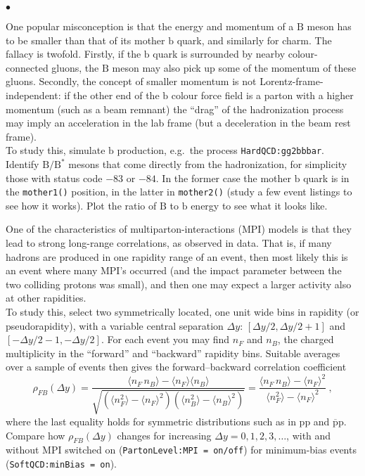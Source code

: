 \documentclass[12pt,a4paper]{article}
\renewcommand{\b}{{\mathrm b}}
\newcommand{\p}{{\mathrm p}}
\renewcommand{\B}{{\mathrm B}}
\newcommand{\pbar}{\overline{\mathrm p}}
\newenvironment{Itemize}{\begin{list}{$\bullet$}%
{\setlength{\topsep}{0.4mm}\setlength{\partopsep}{0.4mm}%
\setlength{\itemsep}{0.4mm}\setlength{\parsep}{0.4mm}}}%
{\end{list}}
\begin{document}
\begin{Itemize}
\item One popular misconception is that the energy and momentum of a 
$\B$ meson has to be smaller than that of its mother $\b$ quark, and 
similarly for charm. The fallacy is twofold. Firstly, if the $\b$ 
quark is surrounded by nearby colour-connected gluons, the $\B$ meson 
may also pick up some of the momentum of these gluons. Secondly, the
concept of smaller momentum is not Lorentz-frame-independent:
if the other end of the $\b$ colour force field is a parton with a
higher momentum (such as a beam remnant) the ``drag'' of the 
hadronization process may imply an acceleration in the lab frame
(but a deceleration in the beam rest frame).\\
To study this, simulate $\b$ production, e.g.\ the process
\texttt{HardQCD:gg2bbbar}. Identify $\B / \B^*$ mesons that
come directly from the hadronization, for simplicity those with
status code $-83$ or $-84$. In the former case the mother $\b$
quark is in the \texttt{mother1()} position, in the latter in
\texttt{mother2()} (study a few event listings to see how it works).
Plot the ratio of $\B$ to $\b$ energy to see what it looks like.       

\item One of the characteristics of multiparton-interactions (MPI) models
is that they lead to strong long-range correlations, as observed in
data. That is, if many hadrons are produced in one rapidity range
of an event, then most likely this is an event where many MPI's
occurred (and the impact parameter between the two colliding protons
was small), and then one may expect a larger activity also at other
rapidities.\\
To study this, select two symmetrically located, one unit wide bins 
in rapidity (or pseudorapidity), with a variable central separation 
$\Delta y$: $\left[ \Delta y/2, \Delta y/2 + 1 \right]$ and 
$\left[ - \Delta y/2 - 1, - \Delta y/2 \right]$.
For each event you may find $n_F$ and $n_B$, the charged multiplicity 
in the ``forward'' and ``backward'' rapidity bins. Suitable averages 
over a sample of events then gives the forward--backward correlation 
coefficient
\[
\rho_{FB}(\Delta y) = \frac{\langle n_F \, n_B \rangle 
- \langle n_F \rangle \langle n_B \rangle}%
{\sqrt{(\langle n_F^2 \rangle - \langle n_F \rangle^2)
(\langle n_B^2 \rangle - \langle n_B \rangle^2)}} 
= \frac{\langle n_F \, n_B \rangle - \langle n_F \rangle^2}%
{\langle n_F^2 \rangle - \langle n_F \rangle^2} ~,
\]
where the last equality holds for symmetric distributions such as
in $\p\p$ and $\pbar\p$.\\
Compare how $\rho_{FB}(\Delta y)$ changes for increasing
$\Delta y = 0, 1, 2, 3, \ldots$, with and without MPI switched on
(\texttt{PartonLevel:MPI = on/off}) for minimum-bias events
(\texttt{SoftQCD:minBias = on}).


\end{Itemize}
\end{document}
